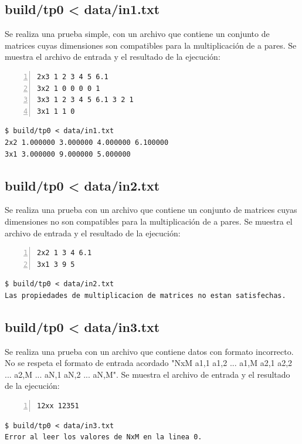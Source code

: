 \documentclass[a4paper,10pt]{article}
\begin{document}
\subsection{build/tp0 < data/in1.txt}
Se realiza una prueba simple, con un archivo que contiene un conjunto de matrices cuyas dimensiones son compatibles para la multiplicaci\'on de a pares. Se muestra el archivo de entrada y el resultado de la ejecuci\'on:

\begin{lstlisting}[numbers=left,language=bash]
2x3 1 2 3 4 5 6.1
3x2 1 0 0 0 0 1
3x3 1 2 3 4 5 6.1 3 2 1
3x1 1 1 0
\end{lstlisting}
\begin{lstlisting}
$ build/tp0 < data/in1.txt
2x2 1.000000 3.000000 4.000000 6.100000 
3x1 3.000000 9.000000 5.000000
\end{lstlisting}

\subsection{build/tp0 < data/in2.txt}
Se realiza una prueba con un archivo que contiene un conjunto de matrices cuyas dimensiones no son compatibles para la multiplicaci\'on de a pares. Se muestra el archivo de entrada y el resultado de la ejecuci\'on:

\begin{lstlisting}[numbers=left,language=bash]
2x2 1 3 4 6.1
3x1 3 9 5
\end{lstlisting}
\begin{lstlisting}
$ build/tp0 < data/in2.txt
Las propiedades de multiplicacion de matrices no estan satisfechas.
\end{lstlisting}


\subsection{build/tp0 < data/in3.txt}
Se realiza una prueba con un archivo que contiene datos con formato incorrecto. No se respeta el formato de entrada acordado "NxM a1,1 a1,2 ... a1,M a2,1 a2,2 ... a2,M ... aN,1 aN,2 ... aN,M". Se muestra el archivo de entrada y el resultado de la ejecuci\'on:

\begin{lstlisting}[numbers=left,language=bash]
12xx 12351
\end{lstlisting}
\begin{lstlisting}
$ build/tp0 < data/in3.txt
Error al leer los valores de NxM en la linea 0.
\end{lstlisting}
\end{document}
